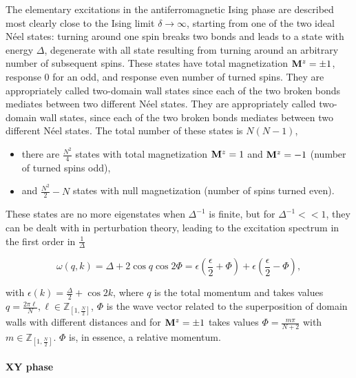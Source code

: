 \documentclass{homework}
\begin{document}
The elementary excitations in the antiferromagnetic Ising phase are described most clearly close to the Ising limit $\delta \rightarrow \infty$, starting from one of the two ideal Néel states: turning around one spin breaks two bonds and leads to a state with energy $\Delta$, degenerate with all state resulting from turning around an arbitrary number of subsequent spins. These states have total magnetization ${\bf M}^z = \pm 1$, response 0 for an odd, and response even number of turned spins. They are appropriately called two-domain wall states since each of the two broken bonds mediates between two different Néel states. They are appropriately called two-domain wall states, since each of the two broken bonds mediates between two different Néel states. The total number of these states is $N(N-1)$, 

\begin{itemize}
    \item there are $\frac{N^2}{4}$ states with total magnetization ${\bf M}^z= 1$ and ${\bf M}^z= -1$ (number of turned spins odd),
    \item and $\frac{N^2}{2}-N$ states with null magnetization (number of spins turned even). 
\end{itemize}

These states are no more eigenstates when $\Delta^{-1}$ is finite, but for $\Delta^{-1} << 1$, they can be dealt with in perturbation theory, leading to the excitation spectrum in the first order in $\frac{1}{\Delta}$

$$
    \omega(q,k) = \Delta + 2 \cos q \cos 2\Phi = \epsilon \left(\frac{\epsilon}{2} + \Phi\right) + \epsilon \left(\frac{\epsilon}{2} - \Phi\right),
$$

with $\epsilon(k) = \frac{\Delta}{2} + \cos 2k$, where $q$ is the total momentum and takes values $q = \frac{2\pi \ell}{N}, \ell \in \mathds{Z}_{[1, \frac{N}{2}]}$, $\Phi$ is the wave vector related to the superposition of domain walls with different distances and for ${\bf M}^z = \pm 1$ takes values $\Phi = \frac{m\pi}{N+2}$ with $m \in \mathds{Z}_{[1, \frac{N}{2}]}$. $\Phi$ is, in essence, a relative momentum. \\ 


\clearpage

\paragraph{\textbf{XY phase}}
\end{document}

